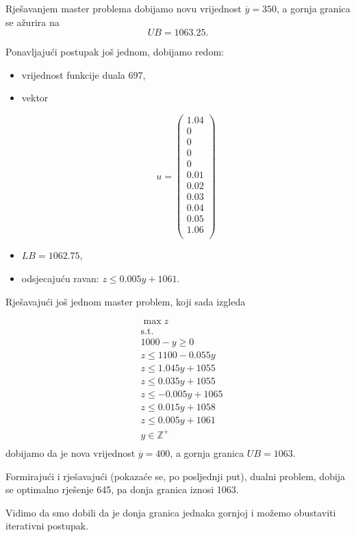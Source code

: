 \documentclass[a4paper, utf8, 11pt, colorlinks]{book}
\theoremstyle{definition}
\begin{document}
 Rješavanjem master problema dobijamo novu vrijednost $\overline{y} =350$, a gornja granica se ažurira na 
 $$UB = 1063.25.$$
 
 Ponavljajući postupak još jednom, dobijamo redom: 
 \begin{itemize}
 	\item 
 vrijednost funkcije duala 697,
 \item vektor
 
  $$u=\left(\begin{array}{c}
 	1.04\\
 	0\\
 	0\\
 	0\\
 	0\\
 	0.01\\
 	0.02\\
 	0.03\\
 	0.04\\
 	0.05\\
 	1.06\\
 \end{array}\right)$$
\item $LB = 1062.75$,
\item odsjecajuću ravan:  $z\leqslant 0.005y+1061$.
\end{itemize}


Rješavajući još jednom master problem, koji sada izgleda

  $$
\begin{aligned}
	&\max z\\
	&\mbox{s.t.}\\
	&1000-y\geqslant 0\\
	&z\leqslant 1100-0.055y\\ 
	&z\leqslant 1.045y+1055\\
	&z\leqslant 0.035y+1055\\
	&z\leqslant -0.005y+1065\\
	&z\leqslant 0.015y+1058\\
	&z\leqslant 0.005y+1061\\
	&y\in\mathbb{Z}^+\\	
\end{aligned}
$$
dobijamo da je nova vrijednost $\overline{y}=400$, a gornja granica $UB = 1063$.

Formirajući i rješavajući (pokazaće se, po posljednji put), dualni problem, dobija se optimalno rješenje 645, pa donja granica iznosi 1063.

Vidimo da smo dobili da je donja granica jednaka gornjoj i možemo obustaviti iterativni postupak.
\end{document}
